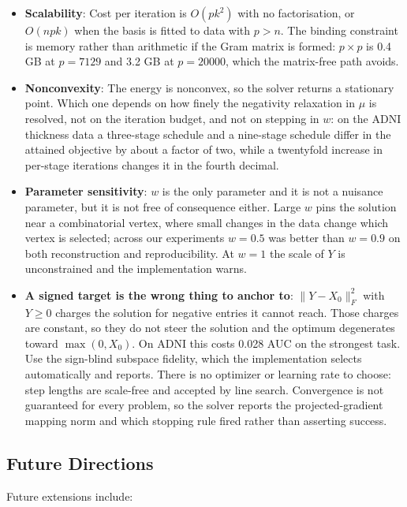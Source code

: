 \documentclass[
]{article}
\providecommand{\tightlist}{%
  \setlength{\itemsep}{0pt}\setlength{\parskip}{0pt}}
\begin{document}
\begin{itemize}
\tightlist
\item
  \textbf{Scalability}: Cost per iteration is \(O(pk^2)\) with no factorisation, or \(O(npk)\) when the basis is fitted to data with \(p > n\). The binding constraint is memory rather than arithmetic if the Gram matrix is formed: \(p \times p\) is 0.4 GB at \(p = 7129\) and 3.2 GB at \(p = 20000\), which the matrix-free path avoids.
\item
  \textbf{Nonconvexity}: The energy is nonconvex, so the solver returns a stationary point. Which one depends on how finely the negativity relaxation in \(\mu\) is resolved, not on the iteration budget, and not on stepping in \(w\): on the ADNI thickness data a three-stage schedule and a nine-stage schedule differ in the attained objective by about a factor of two, while a twentyfold increase in per-stage iterations changes it in the fourth decimal.
\item
  \textbf{Parameter sensitivity}: \(w\) is the only parameter and it is not a nuisance parameter, but it is not free of consequence either. Large \(w\) pins the solution near a combinatorial vertex, where small changes in the data change which vertex is selected; across our experiments \(w = 0.5\) was better than \(w = 0.9\) on both reconstruction and reproducibility. At \(w = 1\) the scale of \(Y\) is unconstrained and the implementation warns.
\item
  \textbf{A signed target is the wrong thing to anchor to}: \(\lVert Y - X_0 \rVert_F^2\) with \(Y \ge 0\) charges the solution for negative entries it cannot reach. Those charges are constant, so they do not steer the solution and the optimum degenerates toward \(\max(0, X_0)\). On ADNI this costs 0.028 AUC on the strongest task. Use the sign-blind subspace fidelity, which the implementation selects automatically and reports.
  There is no optimizer or learning rate to choose: step lengths are scale-free and accepted by line search. Convergence is not guaranteed for every problem, so the solver reports the projected-gradient mapping norm and which stopping rule fired rather than asserting success.
\end{itemize}

\subsection{Future Directions}\label{future-directions}

Future extensions include:
\end{document}
